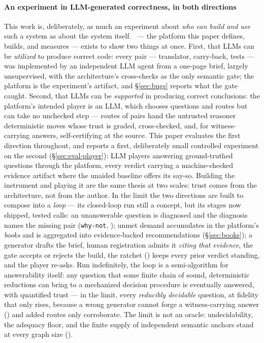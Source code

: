 \paragraph{An experiment in LLM-generated correctness, in both
directions}
This work is, deliberately, as much an experiment about \emph{who can
build and use} such a system as about the system itself. \hg\ --- the
platform this paper defines, builds, and measures --- exists to show
two things at once. First, that LLMs can be \emph{utilized} to
produce correct code: every pair --- translator, carry-back, tests ---
was implemented by an independent LLM agent from a one-page brief,
largely unsupervised, with the architecture's cross-checks as the only
semantic gate; the platform is the experiment's artifact, and
\S\ref{sec:bugs} reports what the gate caught. Second, that LLMs can
be \emph{supported} in producing correct conclusions: the platform's
intended player is an LLM, which chooses questions and routes but can
take no unchecked step --- routes of pairs hand the untrusted reasoner
deterministic moves whose trust is graded, cross-checked, and, for
witness-carrying answers, self-certifying at the source. This paper
evaluates the first direction throughout, and reports a first,
deliberately small controlled experiment on the second
(\S\ref{sec:eval-player}): LLM players answering ground-truthed
questions through the platform, every verdict carrying a
machine-checked evidence artifact where the unaided baseline offers
its say-so. Building the
instrument and playing it are the same thesis at two scales: trust
comes from the architecture, not from the author.\ifarxiv{} In the
limit the two directions are built to compose into a \emph{loop} ---
its closed-loop run still a concept, but its stages now shipped,
tested calls: an unanswerable question is diagnosed and the diagnosis
names the missing pair (\texttt{why-not}, ); unmet
demand accumulates in the platform's \emph{books} and is aggregated
into evidence-backed recommendations (\S\ref{sec:books}); a generator
drafts the brief, human registration admits it \emph{citing that
evidence}, the gate accepts or rejects the build, the ratchet
() keeps every prior verdict standing, and the
player re-asks. Run indefinitely, the
loop is a semi-algorithm for answerability itself: any question that
some finite chain of sound, deterministic reductions can bring to a
mechanized decision procedure is eventually answered, with quantified
trust --- in the limit, every \emph{reducibly decidable} question, at
fidelity that only rises, because a wrong generator cannot forge a
witness-carrying answer () and added routes
only corroborate. The limit is not an oracle: undecidability, the
adequacy floor, and the finite supply of independent semantic anchors
stand at every graph size ().\fi{}

